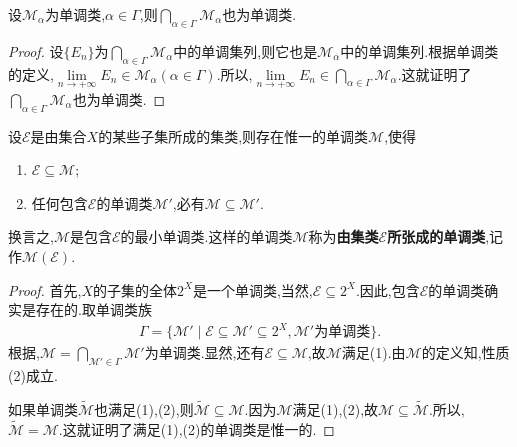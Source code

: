 \documentclass[../../main.tex]{subfiles}%
\begin{document}
\begin{theorem}\label{theorem:单调类的交仍是单调类}
设$\mathscr{M}_\alpha$为单调类,$\alpha \in \Gamma$,则$\bigcap_{\alpha \in \Gamma} \mathscr{M}_\alpha$也为单调类.
\end{theorem}
\begin{proof}
设$\{E_n\}$为$\bigcap_{\alpha \in \Gamma} \mathscr{M}_\alpha$中的单调集列,则它也是$\mathscr{M}_\alpha$中的单调集列.根据单调类的定义,$\lim\limits_{n \to +\infty} E_n \in \mathscr{M}_\alpha(\alpha \in \Gamma)$.所以,$\lim\limits_{n \to +\infty} E_n \in \bigcap_{\alpha \in \Gamma} \mathscr{M}_\alpha$.这就证明了$\bigcap_{\alpha \in \Gamma} \mathscr{M}_\alpha$也为单调类.
\end{proof}

\begin{theorem}
设$\mathscr{E}$是由集合$X$的某些子集所成的集类,则存在惟一的单调类$\mathscr{M}$,使得
\begin{enumerate}[(1)]
\item $\mathscr{E} \subseteq \mathscr{M}$;
\item 任何包含$\mathscr{E}$的单调类$\mathscr{M}'$,必有$\mathscr{M} \subseteq \mathscr{M}'$.
\end{enumerate}
换言之,$\mathscr{M}$是包含$\mathscr{E}$的最小单调类.这样的单调类$\mathscr{M}$称为\textbf{由集类$\mathscr{E}$所张成的单调类},记作$\mathscr{M}(\mathscr{E})$.
\end{theorem}
\begin{proof}
首先,$X$的子集的全体$2^X$是一个单调类,当然,$\mathscr{E} \subseteq 2^X$.因此,包含$\mathscr{E}$的单调类确实是存在的.取单调类族
\begin{align*}
\Gamma = \{\mathscr{M}' \mid \mathscr{E} \subseteq \mathscr{M}' \subseteq 2^X, \mathscr{M}' \text{为单调类}\}.
\end{align*}
根据,$\mathscr{M} = \bigcap_{\mathscr{M}' \in \Gamma} \mathscr{M}'$为单调类.显然,还有$\mathscr{E} \subseteq \mathscr{M}$,故$\mathscr{M}$满足(1).由$\mathscr{M}$的定义知,性质(2)成立.

如果单调类$\widetilde{\mathscr{M}}$也满足(1),(2),则$\widetilde{\mathscr{M}} \subseteq \mathscr{M}$.因为$\mathscr{M}$满足(1),(2),故$\mathscr{M} \subseteq \widetilde{\mathscr{M}}$.所以,$\widetilde{\mathscr{M}} = \mathscr{M}$.这就证明了满足(1),(2)的单调类是惟一的.
\end{proof}
\end{document}
